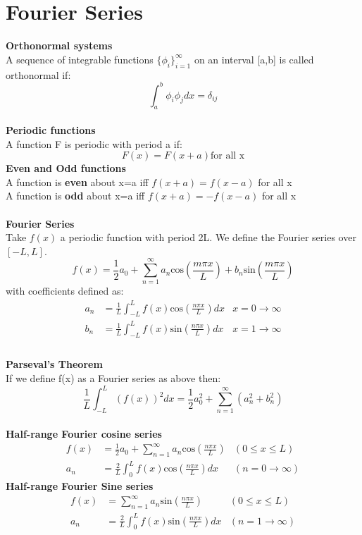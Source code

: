 \documentclass{article}
\begin{document}
\section{Fourier Series}

\textbf{Orthonormal systems}\\
A sequence of integrable functions $\{ \phi_i \}_{i=1}^\infty$ on an interval [a,b] is called orthonormal if:
$$
\int_a^b \phi_i\phi_j dx = \delta_{ij}
$$
\\
\textbf{Periodic functions} \\
A function F is periodic with period a if:
$$
F(x) = F(x+a) \text{for all x}
$$
\textbf{Even and Odd functions}\\
A function is \textbf{even} about x=a iff $f(x+a) = f(x-a)$ for all x \\
A function is \textbf{odd} about x=a iff $f(x+a) = -f(x-a)$ for all x
\\
\\
\textbf{Fourier Series} \\
Take $f(x)$ a periodic function with period 2L. We define the Fourier series over $[-L,L]$.
$$
f(x) = \frac{1}{2}a_0 + \sum_{n=1}^\infty a_n \text{cos}(\frac{m\pi x}{L}) + b_n \text{sin}(\frac{m\pi x}{L})
$$
with coefficients defined as:
\begin{align*}
    a_n &= \frac{1}{L} \int_{-L}^L f(x)\text{cos}(\frac{n\pi x}{L}) dx 
    & x = 0 \to \infty \\
    b_n &= \frac{1}{L} \int_{-L}^L f(x)\text{sin}(\frac{n\pi x}{L}) dx 
    & x = 1 \to \infty \\
\end{align*}
\\
\textbf{Parseval's Theorem} \\
If we define f(x) as a Fourier series as above then:
$$
\frac{1}{L}\int_{-L}^L (f(x))^2 dx = \frac{1}{2}a_0^2 + \sum_{n=1}^\infty (a_n^2 + b_n^2)
$$
\\
\textbf{Half-range Fourier cosine series}
\\
\begin{align*}
    f(x) &= \frac{1}{2}a_0 + \sum_{n=1}^\infty a_n\text{cos}(\frac{n\pi x}{L}) & (0 \leq x \leq L) \\
    a_n &= \frac{2}{L} \int_0^L f(x)\text{cos}(\frac{n\pi x}{L}) dx & (n = 0 \to \infty)
\end{align*}
\textbf{Half-range Fourier Sine series}
\\
\begin{align*}
    f(x) &= \sum_{n=1}^\infty a_n\text{sin}(\frac{n\pi x}{L}) & (0 \leq x \leq L) \\
    a_n &= \frac{2}{L} \int_0^L f(x)\text{sin}(\frac{n\pi x}{L}) dx & (n = 1 \to \infty)
\end{align*}
\end{document}
